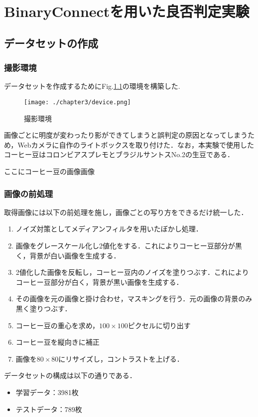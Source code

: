 
\chapter{BinaryConnectを用いた良否判定実験}

\section{データセットの作成}
\subsection{撮影環境}
データセットを作成するためにFig.\ref{fig_camera}の環境を構築した.
\begin{figure}[htbp]
  \begin{center}
    \texttt{[image: ./chapter3/device.png]}
    \caption{撮影環境}
    \label{fig_camera}
  \end{center}
\end{figure}

画像ごとに明度が変わったり影ができてしまうと誤判定の原因となってしまうため，Webカメラに自作のライトボックスを取り付けた．なお，本実験で使用したコーヒー豆はコロンビアスプレモとブラジルサントスNo.2の生豆である．

ここにコーヒー豆の画像画像

\subsection{画像の前処理}
取得画像には以下の前処理を施し，画像ごとの写り方をできるだけ統一した．
\begin{enumerate}
\item ノイズ対策としてメディアンフィルタを用いたぼかし処理．
\item 画像をグレースケール化し2値化をする．これによりコーヒー豆部分が黒く，背景が白い画像を生成する．
\item 2値化した画像を反転し，コーヒー豆内のノイズを塗りつぶす．これによりコーヒー豆部分が白く，背景が黒い画像を生成する．
\item その画像を元の画像と掛け合わせ，マスキングを行う．元の画像の背景のみ黒く塗りつぶす．
\item コーヒー豆の重心を求め，$100\times 100$ピクセルに切り出す
\item コーヒー豆を縦向きに補正
\item 画像を$80\times 80$にリサイズし，コントラストを上げる．
\end{enumerate}

データセットの構成は以下の通りである．
\begin{itemize}
  \item 学習データ：3981枚
  \item テストデータ：789枚
\end{itemize}

